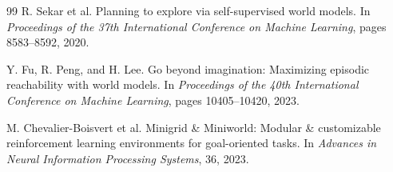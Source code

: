 \documentclass{article}
\begin{document}
\begin{thebibliography}{99}
R. Sekar et al.
\newblock Planning to explore via self-supervised world models.
\newblock In \emph{Proceedings of the 37th International Conference on Machine Learning}, pages 8583--8592, 2020.

Y. Fu, R. Peng, and H. Lee.
\newblock Go beyond imagination: Maximizing episodic reachability with world models.
\newblock In \emph{Proceedings of the 40th International Conference on Machine Learning},
pages 10405--10420, 2023.

M. Chevalier-Boisvert et al.
\newblock Minigrid \& Miniworld: Modular \& customizable reinforcement learning environments for goal-oriented tasks.
\newblock In \emph{Advances in Neural Information Processing Systems}, 36, 2023.

\end{thebibliography}
\end{document}
